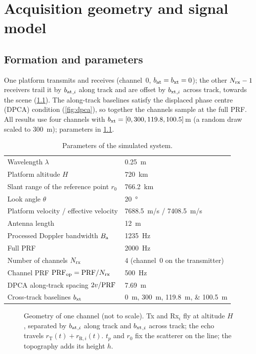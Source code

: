 \chapter{Acquisition geometry and signal model}\label{ch:model}

\section{Formation and parameters}

One platform transmits and receives (channel~0, ${b_{\mathrm{at}}}={b_{\mathrm{xt}}}=0$); the other ${N_{\mathrm{rx}}}-1$ receivers trail it by ${b_{\mathrm{at}}}_{,i}$
along track and are offset by ${b_{\mathrm{xt}}}_{,i}$ across track, towards the scene (\cref{fig:geometry}). The along-track baselines
satisfy the displaced phase centre (DPCA) condition (\cref{fig:dpca}), so together the channels sample at the full PRF. All
results use four channels with ${b_{\mathrm{xt}}}=[0,300,119.8,100.5]$\,\si{m} (a random draw scaled to \SI{300}{m}); parameters in
\cref{tab:params}.

\begin{table}[htbp]
\centering
\caption{Parameters of the simulated system.}\label{tab:params}
\begin{tabular}{@{}l l@{}}
\toprule
Wavelength $\lambda$ & \SI{0.25}{m} \\
Platform altitude $H$ & \SI{720}{km} \\
Slant range of the reference point $r_0$ & \SI{766.2}{km} \\
Look angle $\theta$ & \SI{20}{\degree} \\
Platform velocity / effective velocity & \SI{7688.5}{m/s} / \SI{7408.5}{m/s} \\
Antenna length & \SI{12}{m} \\
Processed Doppler bandwidth $B_{\mathrm{a}}$ & \SI{1235}{Hz} \\
Full PRF & \SI{2000}{Hz} \\
Number of channels ${N_{\mathrm{rx}}}$ & 4 (channel~0 on the transmitter) \\
Channel PRF $\mathrm{PRF}_{\mathrm{op}}=\mathrm{PRF}/{N_{\mathrm{rx}}}$ & \SI{500}{Hz} \\
DPCA along-track spacing $2v/\mathrm{PRF}$ & \SI{7.69}{m} \\
Cross-track baselines ${b_{\mathrm{xt}}}$ & \SIlist{0;300;119.8;100.5}{m} \\
\bottomrule
\end{tabular}
\end{table}

\begin{figure}[htbp]
\centering

\caption[Bistatic geometry of one channel]{Geometry of one channel (not to scale). Tx and Rx$_i$ fly at altitude $H$,
separated by ${b_{\mathrm{at}}}_{,i}$ along track and ${b_{\mathrm{xt}}}_{,i}$ across track; the echo travels $r_{\mathrm T}(t)+r_{\mathrm R,i}(t)$.
$t_p$ and $r_0$ fix the scatterer on the line; the topography adds its height $h$.}
\label{fig:geometry}
\end{figure}

